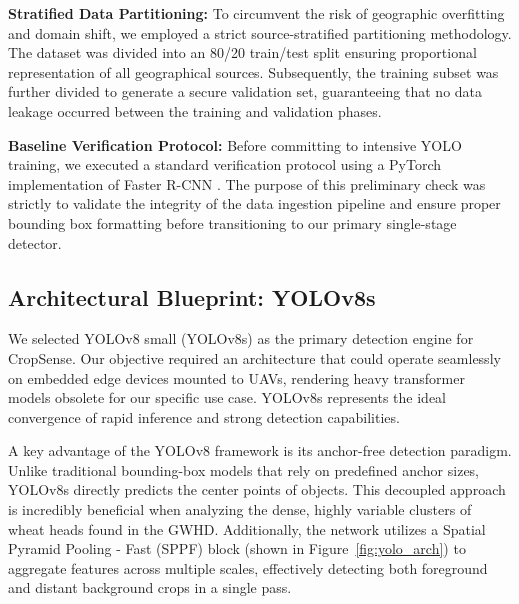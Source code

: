 \textbf{Stratified Data Partitioning:} To circumvent the risk of geographic overfitting and domain shift, we employed a strict source-stratified partitioning methodology. The dataset was divided into an 80/20 train/test split ensuring proportional representation of all geographical sources. Subsequently, the training subset was further divided to generate a secure validation set, guaranteeing that no data leakage occurred between the training and validation phases.

\textbf{Baseline Verification Protocol:} Before committing to intensive YOLO training, we executed a standard verification protocol using a PyTorch implementation of Faster R-CNN \cite{ren2015faster}. The purpose of this preliminary check was strictly to validate the integrity of the data ingestion pipeline and ensure proper bounding box formatting before transitioning to our primary single-stage detector.

\subsection{Architectural Blueprint: YOLOv8s}
\label{subsec:architecture}

We selected YOLOv8 small (YOLOv8s) as the primary detection engine for CropSense. Our objective required an architecture that could operate seamlessly on embedded edge devices mounted to UAVs, rendering heavy transformer models obsolete for our specific use case. YOLOv8s represents the ideal convergence of rapid inference and strong detection capabilities.

A key advantage of the YOLOv8 framework is its anchor-free detection paradigm. Unlike traditional bounding-box models that rely on predefined anchor sizes, YOLOv8s directly predicts the center points of objects. This decoupled approach is incredibly beneficial when analyzing the dense, highly variable clusters of wheat heads found in the GWHD. Additionally, the network utilizes a Spatial Pyramid Pooling - Fast (SPPF) block (shown in Figure~\ref{fig:yolo_arch}) to aggregate features across multiple scales, effectively detecting both foreground and distant background crops in a single pass.
